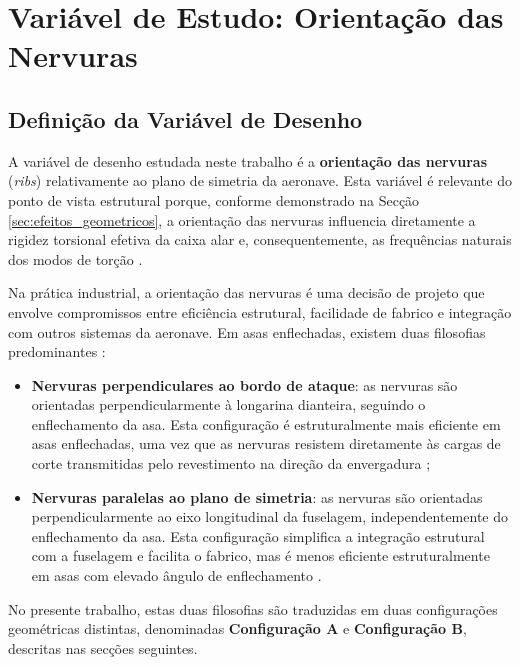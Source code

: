 \documentclass[a4paper,fleqn]{cas-sc}
\begin{document}
\clearpage

\section{Variável de Estudo: Orientação das Nervuras}
\label{chap:variavel}

\subsection{Definição da Variável de Desenho}

A variável de desenho estudada neste trabalho é a \textbf{orientação das nervuras} (\textit{ribs}) relativamente ao plano de simetria da aeronave. Esta variável é relevante do ponto de vista estrutural porque, conforme demonstrado na Secção \ref{sec:efeitos_geometricos}, a orientação das nervuras influencia diretamente a rigidez torsional efetiva da caixa alar e, consequentemente, as frequências naturais dos modos de torção \cite{Niu1988, Megson2012}.

Na prática industrial, a orientação das nervuras é uma decisão de projeto que envolve compromissos entre eficiência estrutural, facilidade de fabrico e integração com outros sistemas da aeronave. Em asas enflechadas, existem duas filosofias predominantes \cite{Raymer2018, Niu1988}:

\begin{itemize}
    \item \textbf{Nervuras perpendiculares ao bordo de ataque}: as nervuras são orientadas perpendicularmente à longarina dianteira, seguindo o enflechamento da asa. Esta configuração é estruturalmente mais eficiente em asas enflechadas, uma vez que as nervuras resistem diretamente às cargas de corte transmitidas pelo revestimento na direção da envergadura \cite{Megson2012};

    \item \textbf{Nervuras paralelas ao plano de simetria}: as nervuras são orientadas perpendicularmente ao eixo longitudinal da fuselagem, independentemente do enflechamento da asa. Esta configuração simplifica a integração estrutural com a fuselagem e facilita o fabrico, mas é menos eficiente estruturalmente em asas com elevado ângulo de enflechamento \cite{Niu1988}.
\end{itemize}

No presente trabalho, estas duas filosofias são traduzidas em duas configurações geométricas distintas, denominadas \textbf{Configuração A} e \textbf{Configuração B}, descritas nas secções seguintes.
\end{document}
